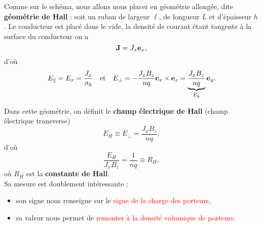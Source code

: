 \documentclass[11pt,a4paper]{report}
\begin{document}
Comme sur le schéma, nous allons nous placer en géométrie allongée, dite \textbf{géométrie de Hall} : soit un ruban de largeur $\ell$, de longueur $L$ et d'épaisseur $h$. Le conducteur est placé dans le vide, la densité de courant étant tangente à la surface du conducteur on a 
\begin{equation}
	\bold{J} = J_x\bold{e}_x,
\end{equation}
d'où
\begin{equation}
	E_\parallel = E_x = \frac{J_x}{\sigma_0} \quad\text{et}\quad E_\perp = - \frac{J_x B_z}{nq} \bold{e}_x\times\bold{e}_z  = \underbrace{\frac{J_x B_z}{nq}}_{E_y}\bold{e}_y.
\end{equation}

Dans cette géométrie, on définit le \textbf{champ électrique de Hall} (champ électrique transverse)
\begin{equation}
	E_H \equiv E_\perp = \frac{J_x B_z}{nq},
\end{equation}
d'où
\begin{equation}
	\frac{E_H}{J_xB_z} = \frac{1}{nq} \equiv R_H,
\end{equation}
où $R_H$ est la \textbf{constante de Hall}.\\

Sa mesure est doublement intéressante :
\begin{itemize}
	\item son signe nous renseigne sur le \textcolor{red}{signe de la charge des porteurs},
	\item sa valeur nous permet de \textcolor{red}{remonter à la densité volumique de porteurs}.
\end{itemize}

%
\end{document}
